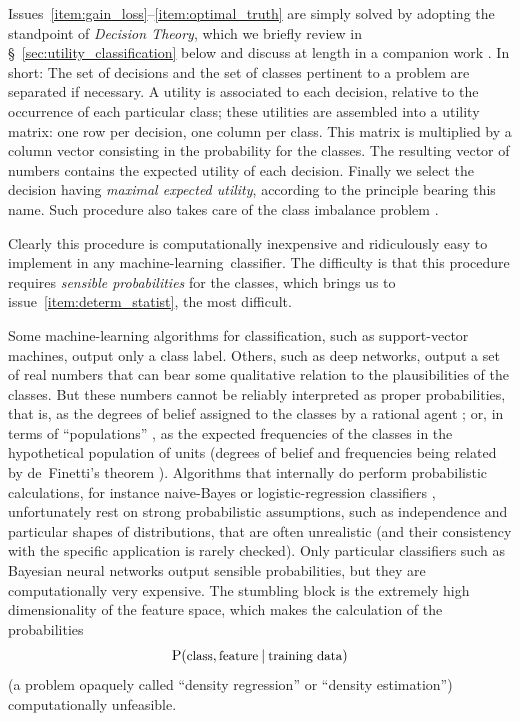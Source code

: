 \documentclass[\ifafour a4paper,12pt,\else a5paper,10pt,\fi%
onecolumn,oneside,article,%
british%
]{memoir}
\theoremstyle{remark}
\theoremstyle{innote}
\renewcommand*{\P}{\mathrm{P}}%
\renewcommand*{\|}[1][]{\nonscript\:#1\vert\nonscript\:\mathopen{}}
\newcommand*{\sect}{\S}%
\newcommand*{\sects}{\S\S}%
\newcommand*{\chap}{ch.}%
\newcommand*{\chaps}{chs}%
\newcommand*{\cf}{{cf.}}
\newcommand*{\texts}[1]{\text{\small #1}}
\newcommand*{\ml}{machine-learning}
\begin{document}
Issues~\ref{item:gain_loss}--\ref{item:optimal_truth} are simply solved by adopting the standpoint of \emph{Decision Theory}, which we briefly review in \sect~\ref{sec:utility_classification} below and discuss at length in a companion work \autocites{dyrlandetal2022}. In short: The set of decisions and the set of classes pertinent to a problem are separated if necessary. A utility is associated to each decision, relative to the occurrence of each particular class; these utilities are assembled into a utility matrix: one row per decision, one column per class. This matrix is multiplied by a column vector consisting in the probability for the classes. The resulting vector of numbers contains the expected utility of each decision. Finally we select the decision having \emph{maximal expected utility}, according to the principle bearing this name. Such procedure also takes care of the class imbalance problem \autocites[\cf\ the analysis by][(they use the term \enquote{cost} instead of \enquote{utility})]{drummondetal2005}.

Clearly this procedure is computationally inexpensive and ridiculously easy to implement in any \ml\ classifier. The difficulty is that this procedure requires \emph{sensible probabilities} for the classes, which brings us to issue~\ref{item:determ_statist}, the most difficult.

Some machine-learning algorithms for classification, such as support-vector machines, output only a class label. Others, such as deep networks, output a set of real numbers that can bear some qualitative relation to the plausibilities of the classes. But these numbers cannot be reliably interpreted as proper probabilities, that is, as the degrees of belief assigned to the classes by a rational agent \autocites{mackay1992d,galetal2016}[\chaps~2, 12, 13]{russelletal1995_r2022}; or, in terms of \enquote{populations} \autocites{lindleyetal1981}%
, as the expected frequencies of the classes in the hypothetical population of units (degrees of belief and frequencies being related by de~Finetti's theorem \autocites[\chap~4]{bernardoetal1994_r2000}{dawid2013}). Algorithms that internally do perform probabilistic calculations, for instance naive-Bayes or logistic-regression classifiers \autocites[\sect~3.5, \chap~8]{murphy2012}[\sects~8.2, 4.3]{bishop2006}[\chap~10, \sect~17.4]{barber2007_r2020}, unfortunately rest on strong probabilistic assumptions, such as independence and particular shapes of distributions, that are often unrealistic (and their consistency with the specific application is rarely checked). Only particular classifiers such as Bayesian neural networks \autocites{nealetal2006}[\sect~5.7]{bishop2006} output sensible probabilities, but they are computationally very expensive. The stumbling block is the extremely high dimensionality of the feature space, which makes the calculation of the probabilities
\[
  \P(\texts{class}, \texts{feature} \| \texts{training data})
\]
(a problem opaquely called \enquote{density regression} or \enquote{density estimation}\autocites{ferguson1983,thorburn1986,hjort1996,dunsonetal2007}) computationally unfeasible.
\end{document}
